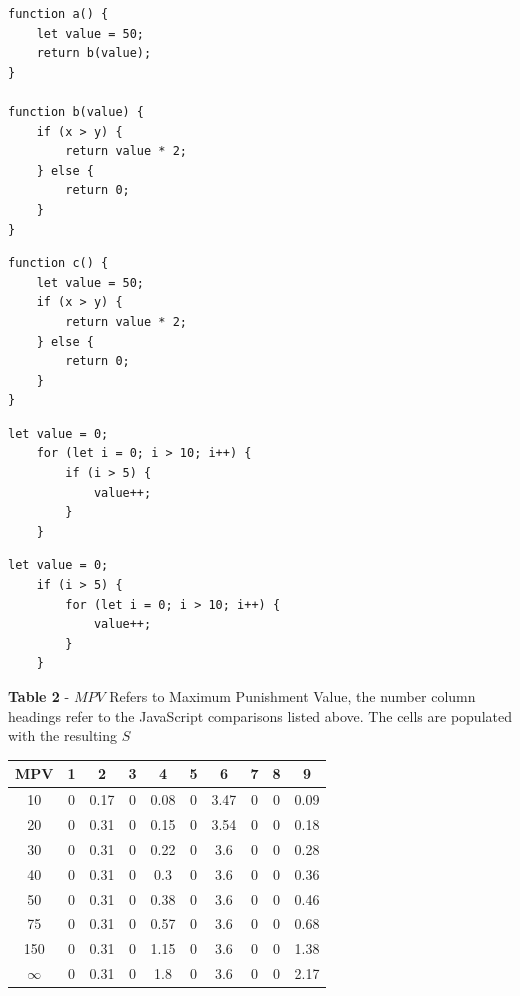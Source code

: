\documentclass[jou,apacite]{apa6}
\begin{document}
\begin{lstlisting}[caption=Comparison 8a - Functing call vs inlining]
function a() {
	let value = 50;
	return b(value);
}

function b(value) {
	if (x > y) {
		return value * 2;
	} else {
		return 0;
	}
}
\end{lstlisting}

\begin{lstlisting}[caption=Comparison 8b]
function c() {
	let value = 50;
	if (x > y) {
		return value * 2;
	} else {
		return 0;
	}
}
\end{lstlisting}

\begin{lstlisting}[caption=Comparison 9a - Inversion of control structure]
	let value = 0;
	for (let i = 0; i > 10; i++) {
		if (i > 5) {
			value++;
		}
	}
\end{lstlisting}

\begin{lstlisting}[caption=Comparison 9b - Inversion of control structure]
	let value = 0;
	if (i > 5) {
		for (let i = 0; i > 10; i++) {
			value++;
		}
	}
\end{lstlisting}

\textbf{Table 2} - $MPV$ Refers to Maximum Punishment Value, the number column headings refer to the JavaScript comparisons listed above. The cells are populated with the resulting $S$

\begin{center}
 \begin{tabular}{||c c c c c c c c c c||} 
 \hline
 MPV  & 1 & 2 & 3 & 4 & 5 & 6 & 7 & 8 & 9 \\ [0.5ex] 
 \hline\hline
 10 & 0 & 0.17 & 0 & 0.08 & 0 & 3.47 & 0 & 0 & 0.09 \\ 
 \hline
 20 & 0 & 0.31 & 0 & 0.15 & 0 & 3.54 & 0 & 0 & 0.18 \\ 
 \hline
 30 & 0 & 0.31 & 0 & 0.22 & 0 & 3.6 & 0 & 0 & 0.28 \\ 
 \hline
  40 & 0 & 0.31 & 0 & 0.3 & 0 & 3.6 & 0 & 0 & 0.36 \\ 
  \hline
    50 & 0 & 0.31 & 0 & 0.38 & 0 & 3.6 & 0 & 0 & 0.46 \\ 
  \hline
   75 & 0 & 0.31 & 0 & 0.57 & 0 & 3.6 & 0 & 0 & 0.68 \\ 
  \hline
  150 & 0 & 0.31 & 0 & 1.15 & 0 & 3.6 & 0 & 0 & 1.38 \\ 
  \hline
  $\infty$ & 0 & 0.31 & 0 & 1.8 & 0 & 3.6 & 0 & 0 & 2.17 \\ 
  \hline
  
\end{tabular}
\end{center}
\end{document}
